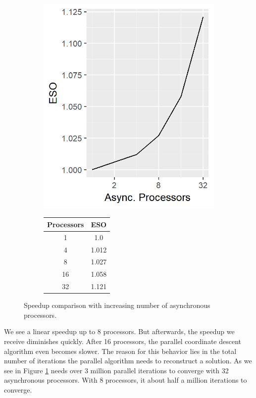 \begin{figure}
\begin{subfigure}{0.30\linewidth}
	\end{subfigure}
	\begin{subfigure}{0.30\linewidth}
		\includegraphics[width=1.0\linewidth]{./chapters/05.pcdm/scalability/speedup_pcdm_eso.png}
	\end{subfigure}
	\begin{subfigure}{0.2\linewidth}
			\begin{tabular}{c | c }
			Processors & ESO \\ \hline
			1 & 1.0 \\
			4 & 1.012 \\
			8 & 1.027 \\
			16 & 1.058 \\
			32 & 1.121 \\
		\end{tabular}
	\end{subfigure}
	\caption{Speedup comparison with increasing number of asynchronous processors.}
	\label{pcdm:scalability:proc}
\end{figure}

We see a linear speedup up to 8 processors. But afterwards, the speedup we receive diminishes quickly. After 16 processors, the parallel coordinate descent algorithm even becomes slower. The reason for this behavior lies in the total number of iterations the parallel algorithm needs to reconstruct a solution. As we see in Figure \ref{pcdm:scalability:proc} needs over 3 million parallel iterations to converge with 32 asynchronous processors. With 8 processors, it about half a million iterations to converge.

